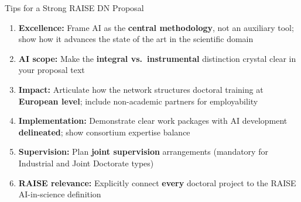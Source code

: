 \documentclass[aspectratio=169]{beamer}
\newcommand{\highlight}[1]{\textcolor{euBlue}{\textbf{#1}}}
\begin{document}
\begin{frame}{Tips for a Strong RAISE DN Proposal}
\begin{enumerate}
  \item \highlight{Excellence:} Frame AI as the \textbf{central methodology}, not an auxiliary tool; show how it advances the state of the art in the scientific domain
  \item \highlight{AI scope:} Make the \textbf{integral vs.\ instrumental} distinction crystal clear in your proposal text
  \item \highlight{Impact:} Articulate how the network structures doctoral training at \textbf{European level}; include non-academic partners for employability
  \item \highlight{Implementation:} Demonstrate clear work packages with AI development \textbf{delineated}; show consortium expertise balance
  \item \highlight{Supervision:} Plan \textbf{joint supervision} arrangements (mandatory for Industrial and Joint Doctorate types)
  \item \highlight{RAISE relevance:} Explicitly connect \textbf{every} doctoral project to the RAISE AI-in-science definition
\end{enumerate}
\end{frame}
\end{document}
